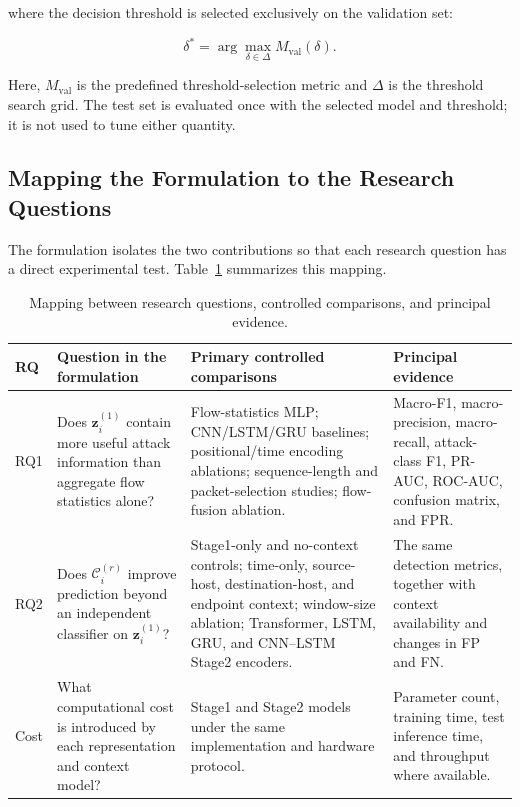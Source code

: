 where the decision threshold is selected exclusively on the validation set:

\begin{equation}
\delta^{*}
=
\arg\max_{\delta\in\Delta}
M_{\mathrm{val}}(\delta).
\end{equation}

Here, $M_{\mathrm{val}}$ is the predefined threshold-selection metric and
$\Delta$ is the threshold search grid. The test set is evaluated once with the
selected model and threshold; it is not used to tune either quantity.

\subsection{Mapping the Formulation to the Research Questions}
\label{subsec:rq_mapping}

The formulation isolates the two contributions so that each research question
has a direct experimental test. Table~\ref{tab:rq_mapping} summarizes this
mapping.

\begin{table}[t]
\centering
\caption{Mapping between research questions, controlled comparisons, and
principal evidence.}
\label{tab:rq_mapping}
\small
\setlength{\tabcolsep}{5pt}
\renewcommand{\arraystretch}{1.15}
\begin{tabular}{@{}p{1.1cm}p{5.0cm}p{5.2cm}p{4.2cm}@{}}
\toprule
\textbf{RQ} & \textbf{Question in the formulation} & \textbf{Primary controlled comparisons} & \textbf{Principal evidence} \\
\midrule
RQ1 & Does $\mathbf{z}^{(1)}_i$ contain more useful attack information than aggregate flow statistics alone? & Flow-statistics MLP; CNN/LSTM/GRU baselines; positional/time encoding ablations; sequence-length and packet-selection studies; flow-fusion ablation. & Macro-F1, macro-precision, macro-recall, attack-class F1, PR-AUC, ROC-AUC, confusion matrix, and FPR. \\
RQ2 & Does $\mathcal{C}^{(r)}_i$ improve prediction beyond an independent classifier on $\mathbf{z}^{(1)}_i$? & Stage1-only and no-context controls; time-only, source-host, destination-host, and endpoint context; window-size ablation; Transformer, LSTM, GRU, and CNN--LSTM Stage2 encoders. & The same detection metrics, together with context availability and changes in FP and FN. \\
Cost & What computational cost is introduced by each representation and context model? & Stage1 and Stage2 models under the same implementation and hardware protocol. & Parameter count, training time, test inference time, and throughput where available. \\
\bottomrule
\end{tabular}
\end{table}

